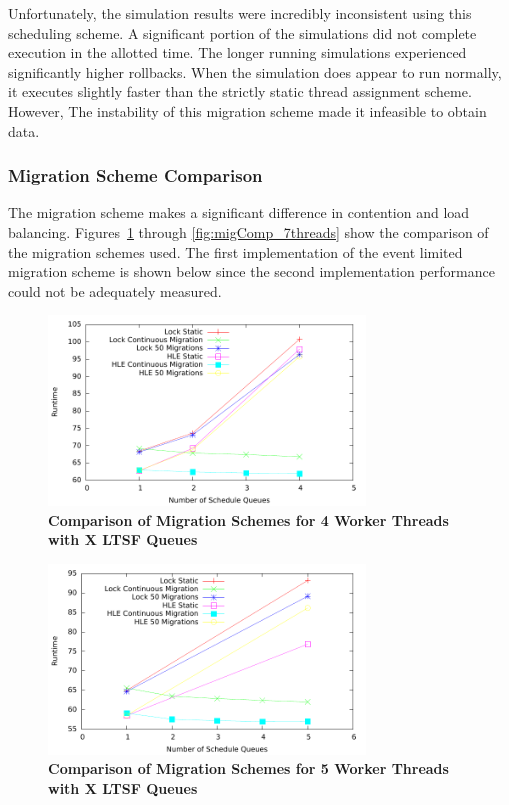 \documentclass[11pt]{book}
\begin{document}
Unfortunately, the simulation results were incredibly inconsistent using this
scheduling scheme.  A significant portion of the simulations did not complete
execution in the allotted time.  The longer running simulations experienced
significantly higher rollbacks.  When the simulation does appear to run
normally, it executes slightly faster than the strictly static thread assignment
scheme.  However, The instability of this migration scheme made it infeasible to
obtain data.

\subsubsection{Migration Scheme Comparison}

The migration scheme makes a significant difference in contention and load
balancing.  Figures~\ref{fig:migComp_4threads} through
\ref{fig:migComp_7threads} show the comparison of the migration schemes used.
The first implementation of the event limited migration scheme is shown below
since the second implementation performance could not be adequately measured.

\begin{figure}
    \centering
    \graphicspath{ {./figures/} }
    \includegraphics[width=0.75\textwidth,keepaspectratio]{migComp_4threads}
    \caption{\textbf{Comparison of Migration Schemes for 4 Worker Threads with X LTSF
        Queues}}\label{fig:migComp_4threads}
\end{figure}

\begin{figure}
    \centering
    \graphicspath{ {./figures/} }
    \includegraphics[width=0.75\textwidth,keepaspectratio]{migComp_5threads}
    \caption{\textbf{Comparison of Migration Schemes for 5 Worker Threads with X LTSF
        Queues}}\label{fig:migComp_5threads}
\end{figure}
\end{document}
